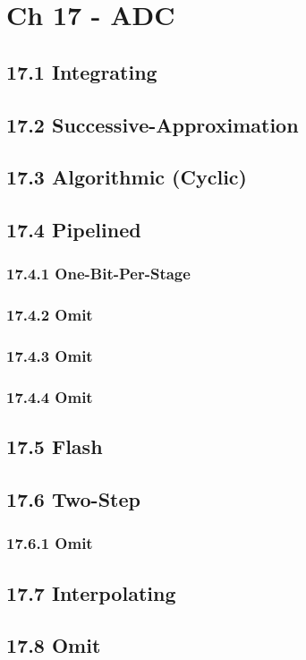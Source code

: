 \documentclass[a4paper,twocolumn]{article}
\begin{document}
  \section{Ch 17 - ADC}
    \subsection{17.1 Integrating}
    \subsection{17.2 Successive-Approximation}
    \subsection{17.3 Algorithmic (Cyclic)}
    \subsection{17.4 Pipelined}
      \subsubsection{17.4.1 One-Bit-Per-Stage}
      \subsubsection{17.4.2 Omit}
      \subsubsection{17.4.3 Omit}
      \subsubsection{17.4.4 Omit}
    \subsection{17.5 Flash}
    \subsection{17.6 Two-Step}
      \subsubsection{17.6.1 Omit}
    \subsection{17.7 Interpolating}
    \subsection{17.8 Omit}
\end{document}
